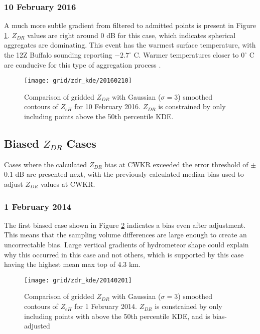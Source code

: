 \subsubsection{10 February 2016}
A much more subtle gradient from filtered to admitted points is present in Figure \ref{fig:grid_zdr_kde_20160210}. $Z_{DR}$ values are right around 0 dB for this case, which indicates spherical aggregates are dominating. This event has the warmest surface temperature, with the 12Z Buffalo sounding reporting $-2.7^{\circ}$ C. Warmer temperatures closer to $0^{\circ}$ C are conducive for this type of aggregation process \citep{Hosler1957}. 
\begin{figure}[H]
\texttt{[image: grid/zdr\_kde/20160210]}
\caption{Comparison of gridded $Z_{DR}$ with Gaussian ($\sigma=3$) smoothed contours of $Z_{eH}$ for 10 February 2016. $Z_{DR}$ is constrained by only including points above the 50th percentile KDE.} 
\label{fig:grid_zdr_kde_20160210}
\end{figure}

\subsection{Biased $Z_{DR}$ Cases}
Cases where the calculated $Z_{DR}$ bias at CWKR exceeded the error threshold of $\pm$ 0.1 dB are presented next, with the previously calculated median bias used to adjust $Z_{DR}$ values at CWKR.
\subsubsection{1 February 2014}
The first biased case shown in Figure \ref{fig:grid_zdr_kde_20140201} indicates a bias even after adjustment. This means that the sampling volume differences are large enough to create an uncorrectable bias. Large vertical gradients of hydrometeor shape could explain why this occurred in this case and not others, which is supported by this case having the highest mean max top of 4.3 km. 
\begin{figure}[H]
\texttt{[image: grid/zdr\_kde/20140201]}
\caption{Comparison of gridded $Z_{DR}$ with Gaussian ($\sigma=3$) smoothed contours of $Z_{eH}$ for 1 February 2014. $Z_{DR}$ is constrained by only including points with above the 50th percentile KDE, and is bias-adjusted} 
\label{fig:grid_zdr_kde_20140201}
\end{figure}

